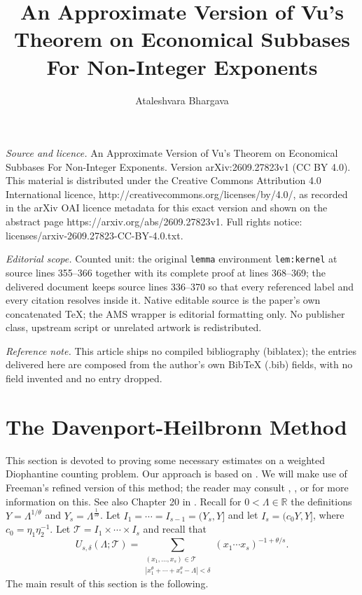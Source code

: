 \documentclass[10pt,a4paper]{amsart}
\numberwithin{equation}{section}
\begin{document}
\title[An Approximate Version of Vu's Theorem on Economical Subbase]{An Approximate Version of Vu's Theorem on Economical Subbases For Non-Integer Exponents}
\author{Ataleshvara Bhargava}
\date{}
\maketitle
\noindent\emph{Source and licence.} An Approximate Version of Vu's Theorem on Economical Subbases For Non-Integer Exponents. Version arXiv:2609.27823v1 (CC BY 4.0). This material is distributed under the Creative Commons Attribution 4.0 International licence, http://creativecommons.org/licenses/by/4.0/, as recorded in the arXiv OAI licence metadata for this exact version and shown on the abstract page https://arxiv.org/abs/2609.27823v1. Full rights notice: licenses/arxiv-2609.27823-CC-BY-4.0.txt.\par\smallskip
\noindent\textit{Editorial scope.} Counted unit: the original \texttt{lemma} environment \texttt{lem:kernel} at source lines 355--366 together with its complete proof at lines 368--369; the delivered document keeps source lines 336--370 so that every referenced label and every citation resolves inside it. Native editable source is the paper's own concatenated TeX; the AMS wrapper is editorial formatting only. No publisher class, upstream script or unrelated artwork is redistributed.\par\smallskip\noindent\textit{Reference note.} This article ships no compiled bibliography (biblatex); the entries delivered here are composed from the author's own BibTeX (.bib) fields, with no field invented and no entry dropped.
\section{The Davenport-Heilbronn Method} \label{sec:DH}
This section is devoted to proving some necessary estimates on a weighted Diophantine counting problem. Our approach is based on \cite{WoolThin}. We will make use of Freeman's refined version of this method; the reader may consult \cite{FreemanLB}, \cite{FreemanAsymp}, \cite{Poulias1} or \cite{WooleyDHF} for more information on this. See also Chapter 20 in \cite{DavBook}. Recall for $0 < \Lambda \in \mathbb{R}$ the definitions $Y = \Lambda^{1/\theta}$ and $Y_s = \Lambda^{\frac{1}{s\theta}}$. 
Let $I_1 = \cdots = I_{s-1} = (Y_s,Y]$ and let $I_s = (c_0Y, Y]$, where $c_0 = \eta_1\eta_2^{-1}$. Let $\mathcal{T} = I_1\times \cdots \times I_s$ and recall that 
\[ U_{s,\delta}(\Lambda; \mathcal{T}) = \sum_{\substack{ (x_1,\ldots,x_s) \in \mathcal{T} \\ |x_1^{\theta}+\cdots+x_s^{\theta}-\Lambda|<\delta }} (x_1\cdots x_s)^{-1+\theta/s}. \]
The main result of this section is the following. 
\end{document}
